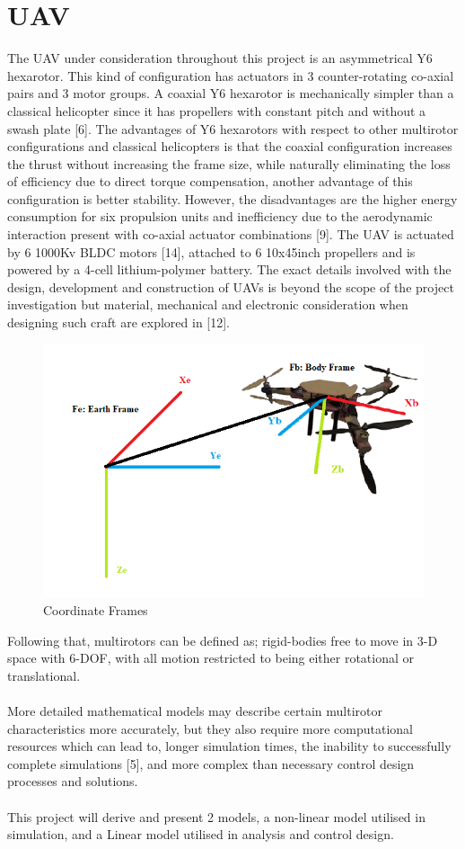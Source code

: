 \documentclass[12pt,a4paper,twoside]{report}
\begin{document}
		\section{UAV}
		
			The UAV under consideration throughout this project is an asymmetrical Y6 hexarotor. This kind of configuration has actuators in 3 counter-rotating co-axial pairs and 3 motor groups. A coaxial Y6 hexarotor is mechanically simpler than a classical helicopter since it has propellers with constant pitch and without a swash plate [6]. The advantages of Y6 hexarotors with respect to other multirotor configurations and classical helicopters is that the coaxial configuration increases the thrust without increasing the frame size, while naturally eliminating the loss of efficiency due to direct torque compensation, another advantage of this configuration is better stability. However, the disadvantages are the higher energy consumption for six propulsion units and inefficiency due to the aerodynamic interaction present with co-axial actuator combinations [9]. The UAV is actuated by 6 1000Kv BLDC motors [14], attached to 6 10x45inch propellers and is powered by a 4-cell lithium-polymer battery. The exact details involved with the design, development and construction of UAVs is beyond the scope of the project investigation but material, mechanical and electronic consideration when designing such craft are explored in [12].
			
			\begin{figure}[h!]
				\centering
				\includegraphics[width=0.7\linewidth]{UAVwithFrames.png}
				\caption{Coordinate Frames}
				\label{fig:Coordinate frames}
			\end{figure} 
		
			Following that, multirotors can be defined as; rigid-bodies free to move in 3-D space with 6-DOF, with all motion restricted to being either rotational or translational.
			\\ \\
			More detailed mathematical models may describe certain multirotor characteristics more accurately, but they also require more computational resources which can lead to, longer simulation times, the inability to successfully complete simulations [5], and more complex than necessary control design processes and solutions.
			\\ \\
			This project will derive and present 2 models, a non-linear model utilised in simulation, and a Linear model utilised in analysis and control design.
			
\end{document}
